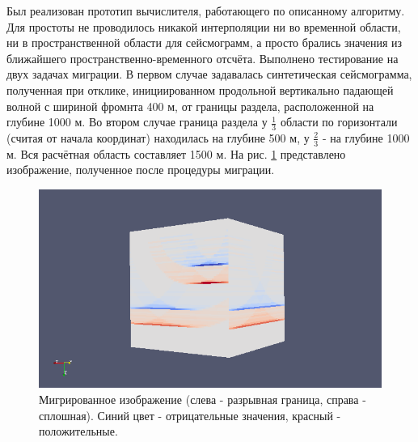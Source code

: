 \documentclass{article}
\begin{document}
Был реализован прототип вычислителя, работающего по описанному алгоритму.
Для простоты не проводилось никакой интерполяции ни во временной области, ни в пространственной области для сейсмограмм, а просто брались значения из ближайшего пространственно-временного отсчёта.
Выполнено тестирование на двух задачах миграции.
В первом случае задавалась синтетическая сейсмограмма, полученная при отклике, инициированном продольной вертикально падающей волной с шириной фромнта 400 м, от границы раздела, расположенной на глубине 1000 м.
Во втором случае граница раздела у $\frac{1}{3}$ области по горизонтали (считая от начала координат) находилась на глубине 500 м, у $\frac{2}{3}$ - на глубине 1000 м.
Вся расчётная область составляет 1500 м.
На рис. \ref{layers_inverted} представлено изображение, полученное после процедуры миграции.
\begin{figure}[ht]
  \center
  \includegraphics[scale=0.5]{pic/layers_inverted.png}
  \caption{Мигрированное изображение (слева - разрывная граница, справа - сплошная). Синий цвет - отрицательные значения, красный - положительные.}
\label{layers_inverted}
\end{figure}
\end{document}
